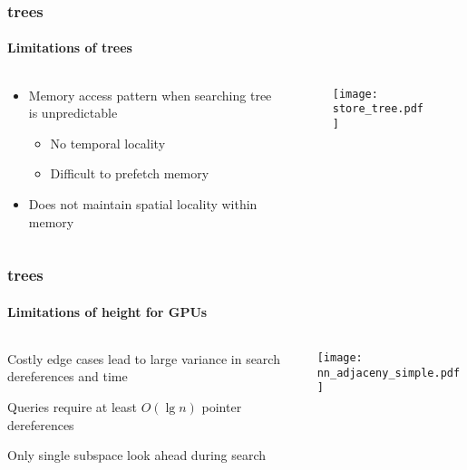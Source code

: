 \begin{frame}
  \frametitle{\kd trees}
  \framesubtitle{Limitations of trees}

  \begin{columns}[T]
    \begin{column}{.5\textwidth}
      \begin{itemize}
        \item Memory access pattern when searching tree is unpredictable
          \begin{itemize}
            \item No temporal locality
            \item Difficult to prefetch memory
          \end{itemize}
        \item Does not maintain spatial locality within memory
      \end{itemize}
    \end{column}
    \begin{column}{.5\textwidth}
      \begin{figure}
        \centering
        \texttt{[image: store\_tree.pdf]}
      \end{figure}
    \end{column}
  \end{columns}

\end{frame}

\begin{frame}
  \frametitle{\kd trees}
  \framesubtitle{Limitations of height for GPUs}

  \begin{columns}[T]
    \begin{column}{.5\textwidth}
      \begin{block}{}%
        {\color{white} \bullet\hspace{1mm} Costly edge cases lead to large variance in search dereferences 
          and time\\\vspace{0.5cm}
        
        \bullet\hspace{1mm} Queries require at least $O(\lg n)$ pointer dereferences\\\vspace{0.5cm}

      \bullet\hspace{1mm} Only single subspace look ahead during search}
      \end{block}
    \end{column}
    \begin{column}{.5\textwidth}
      \begin{block}{}
        \texttt{[image: nn\_adjaceny\_simple.pdf]}
      \end{block}
    \end{column}
  \end{columns}
\end{frame}

